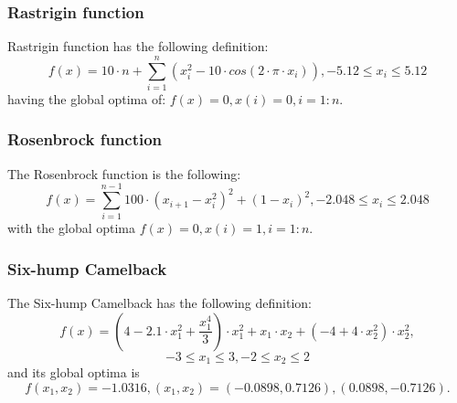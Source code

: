\documentclass{article}
\begin{document}
\subsubsection{Rastrigin function}
Rastrigin function has the following definition:
$$f(x) = 10 \cdot n + \sum_{i=1}^n\left(x_i^2 - 10\cdot cos(2 \cdot \pi \cdot x_i)\right), -5.12 \leq x_i \leq 5.12$$
having the global optima of: $f(x) = 0, x(i) = 0, i = 1:n$.
\subsubsection{Rosenbrock function}
The Rosenbrock function is the following:
$$f(x) = \sum_{i=1}^{n-1}100\cdot\left(x_{i+1} - x_i^2\right)^2 + \left(1 - x_i\right)^2, -2.048 \leq x_i \leq 2.048$$
with the global optima $f(x) = 0, x(i) = 1, i = 1:n$.
\subsubsection{Six-hump Camelback}
The Six-hump Camelback has the following definition:
$$f(x) = \left(4 - 2.1 \cdot x_1^2 + \frac{x_1^4}{3}\right) \cdot x_1 ^2 + x_1 \cdot x_2 + \left(-4 + 4 \cdot x_2^2\right) \cdot x_2^2,$$ $$-3 \leq x_1 \leq 3, -2 \leq x_2 \leq 2$$
and its global optima is $$f(x_1, x_2) = -1.0316, (x_1, x_2) = (-0.0898,0.7126), (0.0898,-0.7126).$$
\end{document}
